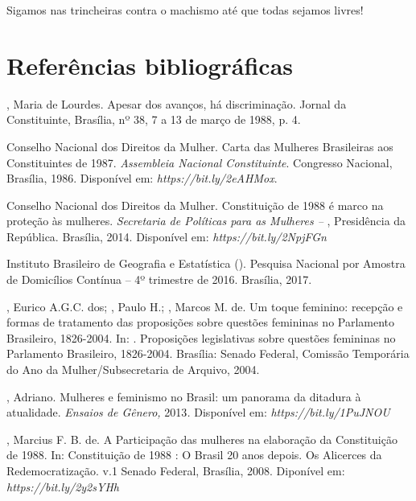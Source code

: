 Sigamos nas trincheiras contra o machismo até que todas sejamos livres!

\section{Referências bibliográficas}

\begin{Parskip}
, Maria de Lourdes. Apesar dos avanços, há discriminação. Jornal
da Constituinte, Brasília, nº 38, 7 a 13 de março de 1988, p. 4.

Conselho Nacional dos Direitos da Mulher. Carta das Mulheres Brasileiras
aos Constituintes de 1987. \emph{Assembleia Nacional Constituinte}.
Congresso Nacional, Brasília, 1986. Disponível em:
\emph{https://bit.ly/2eAHMox}.

Conselho Nacional dos Direitos da Mulher. Constituição de 1988
é marco na proteção às mulheres. \emph{Secretaria de Políticas para as
Mulheres -- }, Presidência da República. Brasília, 2014.
Disponível em:
\emph{https://bit.ly/2NpjFGn}

Instituto Brasileiro de Geografia e Estatística (). Pesquisa
Nacional por Amostra de Domicílios Contínua -- 4º trimestre de 2016.
Brasília, 2017.

, Eurico A.G.C. dos; , Paulo H.; , Marcos M. de. Um
toque feminino: recepção e formas de tratamento das proposições sobre
questões femininas no Parlamento Brasileiro, 1826-2004. In: 
. Proposições legislativas sobre questões femininas no Parlamento
Brasileiro, 1826-2004. Brasília: Senado Federal, Comissão Temporária do
Ano da Mulher/Subsecretaria de Arquivo, 2004.

, Adriano. Mulheres e feminismo no Brasil: um panorama da
ditadura à atualidade. \emph{Ensaios de Gênero,} 2013\emph{.} Disponível
em: \emph{https://bit.ly/1PuJNOU}

, Marcius F. B. de. A Participação das mulheres na elaboração da
Constituição de 1988. In: Constituição de 1988 : O Brasil 20 anos
depois. Os Alicerces da Redemocratização. v.1 Senado Federal, Brasília,
2008. Diponível em: \emph{https://bit.ly/2y2sYHh}
\end{Parskip}